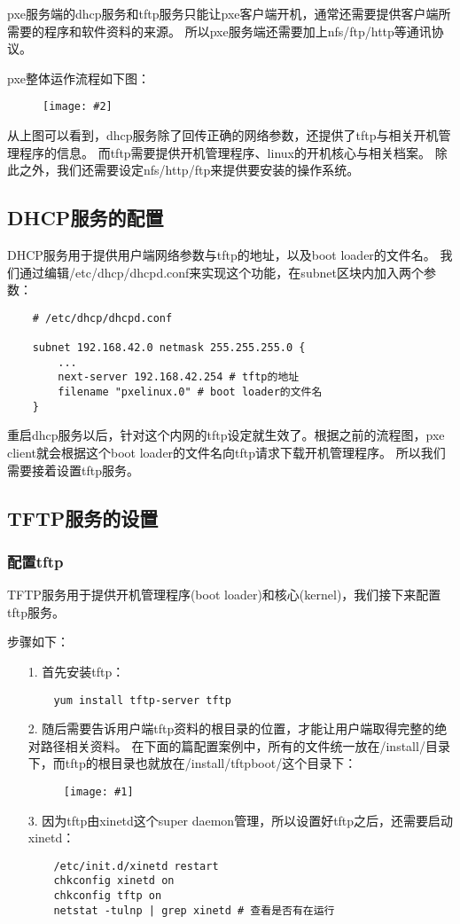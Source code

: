 \documentclass[a4paper,left=1.5cm,right=1.5cm,11pt]{article}
\newcommand{\fic}[1]{\begin{figure}[H]
		\center
		\texttt{[image: \#1]}
	\end{figure}}
\newcommand{\sizedfic}[2]{\begin{figure}[H]
		\center
		\texttt{[image: \#2]}
	\end{figure}}
\begin{document}
	pxe服务端的dhcp服务和tftp服务只能让pxe客户端开机，通常还需要提供客户端所需要的程序和软件资料的来源。
	所以pxe服务端还需要加上nfs/ftp/http等通讯协议。\par

\clearpage

	pxe整体运作流程如下图：
	\sizedfic{0.58}{1.jpg}

	从上图可以看到，dhcp服务除了回传正确的网络参数，还提供了tftp与相关开机管理程序的信息。
	而tftp需要提供开机管理程序、linux的开机核心与相关档案。
	除此之外，我们还需要设定nfs/http/ftp来提供要安装的操作系统。

\subsection{DHCP服务的配置}
	DHCP服务用于提供用户端网络参数与tftp的地址，以及boot loader的文件名。
	我们通过编辑/etc/dhcp/dhcpd.conf来实现这个功能，在subnet区块内加入两个参数：
	\begin{lstlisting}
	# /etc/dhcp/dhcpd.conf

	subnet 192.168.42.0 netmask 255.255.255.0 {
		...
		next-server 192.168.42.254 # tftp的地址
		filename "pxelinux.0" # boot loader的文件名
	}
	\end{lstlisting}

	重启dhcp服务以后，针对这个内网的tftp设定就生效了。根据之前的流程图，pxe client就会根据这个boot loader的文件名向tftp请求下载开机管理程序。
	所以我们需要接着设置tftp服务。

\subsection{TFTP服务的设置}
\subsubsection{配置tftp}
	TFTP服务用于提供开机管理程序(boot loader)和核心(kernel)，我们接下来配置tftp服务。\par

	步骤如下：
	\begin{itemize}
		\item[1.] 首先安装tftp：
		\begin{lstlisting}
	yum install tftp-server tftp
		\end{lstlisting}

		\item[2.] 随后需要告诉用户端tftp资料的根目录的位置，才能让用户端取得完整的绝对路径相关资料。
				  在下面的篇配置案例中，所有的文件统一放在/install/目录下，而tftp的根目录也就放在/install/tftpboot/这个目录下：
				  \fic{2.png}

		\item[3.] 因为tftp由xinetd这个super daemon管理，所以设置好tftp之后，还需要启动xinetd：
		\begin{lstlisting}
	/etc/init.d/xinetd restart
	chkconfig xinetd on
	chkconfig tftp on
	netstat -tulnp | grep xinetd # 查看是否有在运行
		\end{lstlisting}
	\end{itemize}
\end{document}
